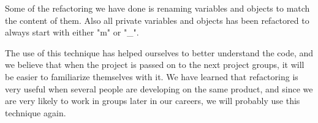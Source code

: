 Some of the refactoring we have done is renaming variables and objects to match the content of them. Also all private variables and objects has been refactored to always start with either "m" or "_".

The use of this technique has helped ourselves to better understand the code, and we believe that when the project is passed on to the next project groups, it will be easier to familiarize themselves with it. We have learned that refactoring is very useful when several people are developing on the same product, and since we are very likely to work in groups later in our careers, we will probably use this technique again.
